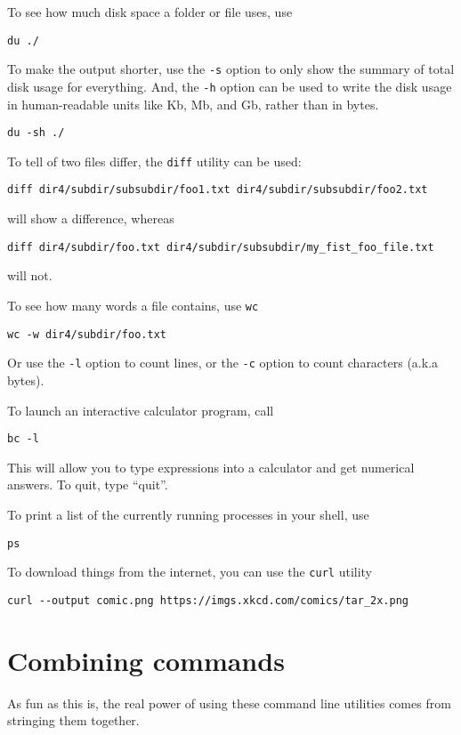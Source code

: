 \documentclass[aps,showpacs,prd,notitlepage,preprintnumbers,amsmath,amssymb,letterpaper]{revtex4}
\begin{document}
To see how much disk space a folder or file uses, use
\begin{verbatim}
du ./
\end{verbatim}
To make the output shorter, use the \verb|-s| option to only show the summary of total disk usage for everything.
And, the \verb|-h| option can be used to write the disk usage in human-readable units like Kb, Mb, and Gb, rather than in bytes.
\begin{verbatim}
du -sh ./
\end{verbatim}

To tell of two files differ, the \verb|diff| utility can be used:
\begin{verbatim}
diff dir4/subdir/subsubdir/foo1.txt dir4/subdir/subsubdir/foo2.txt
\end{verbatim}
will show a difference, whereas
\begin{verbatim}
diff dir4/subdir/foo.txt dir4/subdir/subsubdir/my_fist_foo_file.txt
\end{verbatim}
will not.

To see how many words a file contains, use \verb|wc|
\begin{verbatim}
wc -w dir4/subdir/foo.txt
\end{verbatim}
Or use the \verb|-l| option to count lines, or the \verb|-c| option to count characters (a.k.a bytes).

To launch an interactive calculator program, call
\begin{verbatim}
bc -l
\end{verbatim}
This will allow you to type expressions into a calculator and get numerical answers.
To quit, type ``quit''.

To print a list of the currently running processes in your shell, use
\begin{verbatim}
ps
\end{verbatim}

To download things from the internet, you can use the \verb|curl| utility
\begin{verbatim}
curl --output comic.png https://imgs.xkcd.com/comics/tar_2x.png
\end{verbatim}

\section{Combining commands}

As fun as this is, the real power of using these command line utilities comes from stringing them together.
\end{document}
